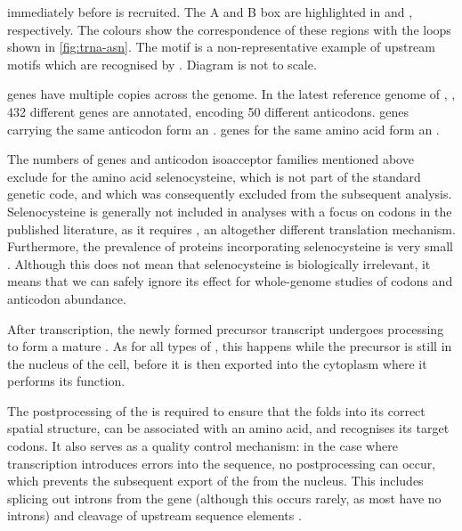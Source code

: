     {immediately before  is recruited. The A and B box are highlighted in
    \primaryname{} and \secondaryname{}, respectively. The colours show the
    correspondence of these regions with the loops shown in \cref{fig:trna-asn}.
    The  motif is a non-representative example of upstream motifs
    which are recognised by . Diagram is not to scale.}

\trna genes have multiple copies across the genome. In the latest reference
genome of \mmu,  \citep{Church:2009}, \num{432} different \trna
genes are annotated, encoding \num{50} different anticodons. \trna genes
carrying the same anticodon form an . \trna
genes for the same amino acid form an .

The numbers of \trna genes and anticodon isoacceptor families mentioned above
exclude \trna[s] for the amino acid selenocysteine, which is not part of the
standard genetic code, and which was consequently excluded from the subsequent
analysis. Selenocysteine is generally not included in analyses with a focus on
codons in the published literature, as it requires , an altogether different translation mechanism. Furthermore, the
prevalence of proteins incorporating selenocysteine is very small
\citep{Reeves:2009}. Although this does not mean that selenocysteine is
biologically irrelevant, it means that we can safely ignore its effect for
whole-genome studies of codons and anticodon abundance.

After transcription, the newly formed precursor \trna transcript undergoes
processing to form a mature \trna. As for all types of \rna, this happens while
the precursor \trna is still in the nucleus of the cell, before it is then
exported into the cytoplasm where it performs its function.

The postprocessing of the \trna is required to ensure that the \trna folds into
its correct spatial structure, can be associated with an amino acid, and
recognises its target codons. It also serves as a quality control mechanism: in
the case where transcription introduces errors into the \trna sequence, no
postprocessing can occur, which prevents the subsequent export of the \trna from
the nucleus. This includes splicing out introns from the \trna gene (although
this occurs rarely, as most \trna[s] have no introns) and cleavage of \fivep
upstream sequence elements \citep{Alberts:2002,Berg:2002}.

